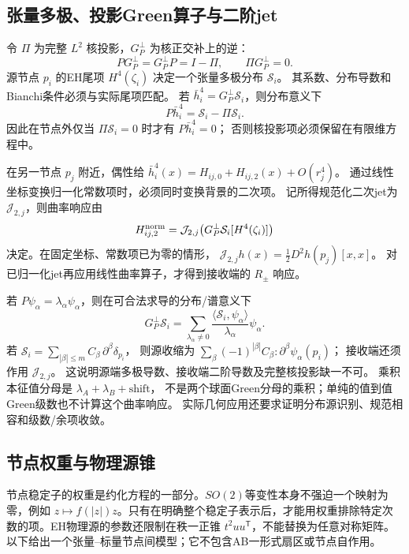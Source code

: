 \documentclass[UTF8,a4paper,11pt,fontset=fandol]{ctexart}
\numberwithin{equation}{section}
\theoremstyle{definition}
\begin{document}
\subsection{张量多极、投影Green算子与二阶jet}\label{sec:greenjet}
令 $\Pi$ 为完整 $L^2$ 核投影，$G_P^\perp$ 为核正交补上的逆：
\[
P G_P^\perp=G_P^\perp P=I-\Pi,\qquad
\Pi G_P^\perp=0.
\]
源节点 $p_i$ 的EH尾项 $H^4(\zeta_i)$ 决定一个张量多极分布 $\mathcal S_i$。
其系数、分布导数和Bianchi条件必须与实际尾项匹配。
若 $\bar h_i^4=G_P^\perp\mathcal S_i$，则分布意义下
\[
P\bar h_i^4=\mathcal S_i-\Pi\mathcal S_i.
\]
因此在节点外仅当 $\Pi\mathcal S_i=0$ 时才有 $P\bar h_i^4=0$；
否则核投影项必须保留在有限维方程中。

在另一节点 $p_j$ 附近，偶性给
$\bar h_i^4(x)=H_{ij,0}+H_{ij,2}(x)+O(r_j^4)$。
通过线性坐标变换归一化常数项时，必须同时变换背景的二次项。
记所得规范化二次jet为 $\mathcal J_{2,j}$，则曲率响应由
\begin{equation}\label{eq:greenjet}
H_{ij,2}^{\rm norm}
=\mathcal J_{2,j}\!\left(G_P^\perp\mathcal S_i[H^4(\zeta_i)]\right)
\end{equation}
决定。在固定坐标、常数项已为零的情形，
$\mathcal J_{2,j}h(x)=\frac12D^2h(p_j)[x,x]$。
对已归一化jet再应用线性曲率算子，才得到接收端的 $R_\pm$ 响应。

若 $P\psi_\alpha=\lambda_\alpha\psi_\alpha$，则在可合法求导的分布/谱意义下
\[
G_P^\perp\mathcal S_i
=\sum_{\lambda_\alpha\ne0}
\frac{\langle\mathcal S_i,\psi_\alpha\rangle}{\lambda_\alpha}\psi_\alpha .
\]
若 $\mathcal S_i=\sum_{|\beta|\le m}C_\beta\,\partial^\beta\delta_{p_i}$，
则源收缩为
$\sum_\beta(-1)^{|\beta|}C_\beta:\partial^\beta\psi_\alpha(p_i)$；
接收端还须作用 $\mathcal J_{2,j}$。
这说明源端多极导数、接收端二阶导数及完整核投影缺一不可。
乘积本征值分母是 $\lambda_A+\lambda_B+\mathrm{shift}$，
不是两个球面Green分母的乘积；单纯的值到值Green级数也不计算这个曲率响应。
实际几何应用还要求证明分布源识别、规范相容和级数/余项收敛。

\subsection{节点权重与物理源锥}
节点稳定子的权重是约化方程的一部分。$SO(2)$等变性本身不强迫一个映射为零，例如 $z\mapsto f(|z|)z$。只有在明确整个稳定子表示后，才能用权重排除特定次数的项。EH物理源的参数还限制在秩一正锥 $t^2uu^{\mathsf T}$，不能替换为任意对称矩阵。以下给出一个张量--标量节点间模型；它不包含AB一形式扇区或节点自作用。
\end{document}
